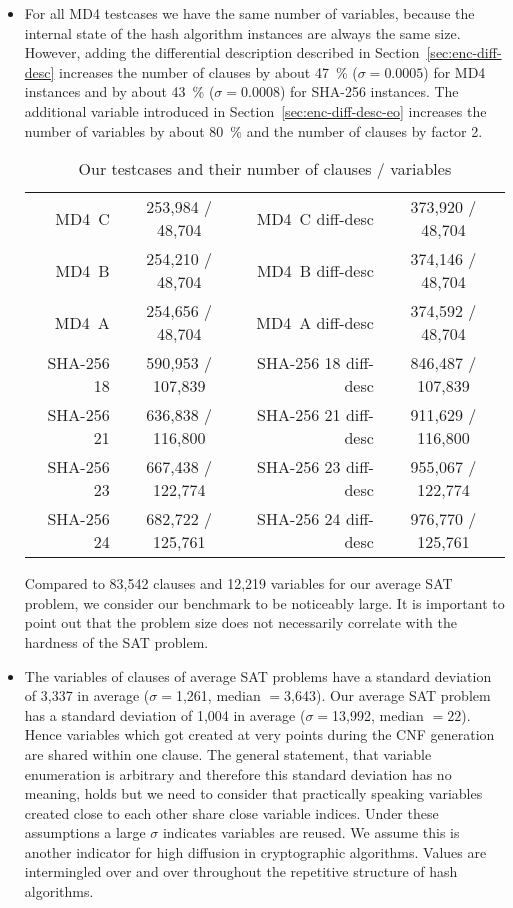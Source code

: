 \begin{itemize}
  \item For all MD4 testcases we have the same number of variables,
    because the internal state of the hash algorithm instances are
    always the same size.
    However, adding the differential description described in
    Section~\ref{sec:enc-diff-desc} increases the number of clauses
    by about 47~\% ($\sigma = 0.0005$) for MD4 instances and
    by about 43~\% ($\sigma = 0.0008$) for SHA-256 instances.
    The additional variable introduced in Section~\ref{sec:enc-diff-desc-eo}
    increases the number of variables by about 80~\%
    and the number of clauses by factor 2.

    \begin{table}[!h]
      \begin{center}
        \begin{tabular}{rc|rc}
          MD4~C & 253,984 / 48,704 & MD4~C diff-desc & 373,920 / 48,704 \\
          MD4~B & 254,210 / 48,704 & MD4~B diff-desc & 374,146 / 48,704 \\
          MD4~A & 254,656 / 48,704 & MD4~A diff-desc & 374,592 / 48,704 \\
          SHA-256 18 & 590,953 / 107,839 & SHA-256 18 diff-desc & 846,487 / 107,839 \\
          SHA-256 21 & 636,838 / 116,800 & SHA-256 21 diff-desc & 911,629 / 116,800 \\
          SHA-256 23 & 667,438 / 122,774 & SHA-256 23 diff-desc & 955,067 / 122,774 \\
          SHA-256 24 & 682,722 / 125,761 & SHA-256 24 diff-desc & 976,770 / 125,761
        \end{tabular}
        \caption{Our testcases and their number of clauses / variables}
      \end{center}
    \end{table}

    Compared to 83,542 clauses and 12,219 variables for our average SAT problem,
    we consider our benchmark to be noticeably large. It is important to
    point out that the problem size does not necessarily correlate with
    the hardness of the SAT problem.

  \item The variables of clauses of average SAT problems
    have a standard deviation of 3,337 in average ($\sigma=$1,261, median $=$3,643).
    Our average SAT problem has a standard deviation of 1,004 in average
    ($\sigma=$13,992, median $=22$). Hence variables which got created at very
    points during the CNF generation are shared within one clause.
    The general statement, that variable enumeration is arbitrary
    and therefore this standard deviation has no meaning, holds but we need
    to consider that practically speaking variables created close to each
    other share close variable indices.
    Under these assumptions a large $\sigma$ indicates variables are reused.
    We assume this is another indicator for high diffusion in cryptographic
    algorithms. Values are intermingled over and over throughout the repetitive
    structure of hash algorithms.


\end{itemize}
